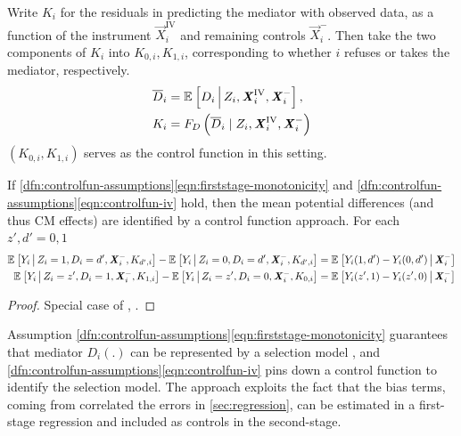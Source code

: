 Write $K_i$ for the residuals in predicting the mediator with observed data, as a function of the instrument $\vec X_i^{\text{IV}}$ and remaining controls $\vec X_i^-$.
Then take the two components of $K_i$ into $K_{0 ,i}, K_{1,i}$, corresponding to whether $i$ refuses or takes the mediator, respectively.
\begin{align*}
    \overline{D}_i &= \mathbb{E}_{} \left[ D_i \, \middle\vert \, Z_i, \boldsymbol{\mathit{X}}_i^{\text{IV}}, \boldsymbol{\mathit{X}}_i^- \right], \\
    K_i &= F_D \left( \overline{D}_i \mid Z_i, \boldsymbol{\mathit{X}}_i^{\text{IV}}, \boldsymbol{\mathit{X}}_i^- \right)
\end{align*}
$\left( K_{0 ,i}, K_{1,i}\right)$ serves as the control function in this setting.
\begin{theorem}
    \label{thm:controlfun}
    If \ref{dfn:controlfun-assumptions}\eqref{eqn:firststage-monotonicity} and \ref{dfn:controlfun-assumptions}\eqref{eqn:controlfun-iv} hold, then the mean potential differences
    (and thus CM effects)
    are identified by a control function approach.
    For each $z', d' = 0,1$
    \begin{align*}
        \mathbb{E}_{} \left[ Y_i \, \middle\vert \, Z_i = 1, D_i = d', \boldsymbol{\mathit{X}}_i^-, K_{d',i} \right]
        - \mathbb{E}_{} \left[ Y_i \, \middle\vert \, Z_i = 0, D_i = d', \boldsymbol{\mathit{X}}_i^-, K_{d',i} \right] 
        &= \mathbb{E}_{} \left[ Y_i(1, d') - Y_i(0, d') \, \middle\vert \, \boldsymbol{\mathit{X}}_i^- \right] \\
        \mathbb{E}_{} \left[ Y_i \, \middle\vert \, Z_i = z', D_i = 1, \boldsymbol{\mathit{X}}_i^-, K_{1,i} \right]
        - \mathbb{E}_{} \left[ Y_i \, \middle\vert \, Z_i = z', D_i = 0, \boldsymbol{\mathit{X}}_i^-, K_{0,i} \right] 
        &= \mathbb{E}_{} \left[ Y_i(z', 1) - Y_i(z', 0) \, \middle\vert \, \boldsymbol{\mathit{X}}_i^- \right]
    \end{align*}
\end{theorem}
\begin{proof}
    Special case of \citet[Theorem~1]{florens2008identification}, \citet[Theorem~3]{imbens2009identification}.
\end{proof}

Assumption \ref{dfn:controlfun-assumptions}\eqref{eqn:firststage-monotonicity} guarantees that mediator $D_i(.)$ can be represented by a selection model \citep{vytlacil2002independence}, and \ref{dfn:controlfun-assumptions}\eqref{eqn:controlfun-iv} pins down a control function to identify the selection model.
The approach exploits the fact that the bias terms, coming from correlated the errors in \autoref{sec:regression}, can be estimated in a first-stage regression and included as controls in the second-stage.


